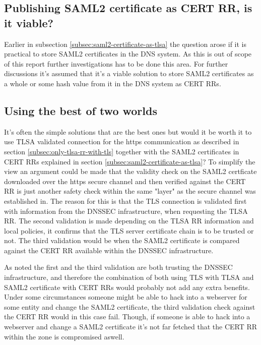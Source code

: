 
\subsection{Publishing SAML2 certificate as CERT RR, is it viable?}
Earlier in subsection \ref{subsec:saml2-certificate-as-tlsa} the question arose if it is practical to store SAML2 certificates in the DNS system.
As this is out of scope of this report further investigations has to be done this area.
For further discussions it's assumed that it's a viable solution to store SAML2 certificates as a whole or some hash value from it in the DNS system as CERT RRs.

\subsection{Using the best of two worlds}
It's often the simple solutions that are the best ones but would it be worth it to use TLSA validated connection for the https communication as described in section \ref{subsec:only-tlsa-rr-with-tls} together with the SAML2 certificates in CERT RRs explained in section \ref{subsec:saml2-certificate-as-tlsa}?
To simplify the view an argument could be made that the validity check on the SAML2 certficate downloaded over the https secure channel and then verified against the CERT RR is just another safety check within the same "layer" as the secure channel was established in.
The reason for this is that the TLS connection is validated first with information from the DNSSEC infrastructure, when requesting the TLSA RR.
The second validation is made depending on the TLSA RR information and local policies, it confirms that the TLS server certificate chain is to be trusted or not.
The third validation would be when the SAML2 certificate is compared against the CERT RR available within the DNSSEC infrastructure.

As noted the first and the third validation are both trusting the DNSSEC infrastructure, and therefore the combination of both using TLS with TLSA and SAML2 certificate with CERT RRs would probably not add any extra benefits.
Under some circumstances someone might be able to hack into a webserver for some entity and change the SAML2 certificate, the third validation check against the CERT RR would in this case fail.
Though, if someone is able to hack into a webserver and change a SAML2 certificate it's not far fetched that the CERT RR within the zone is compromised aswell.

